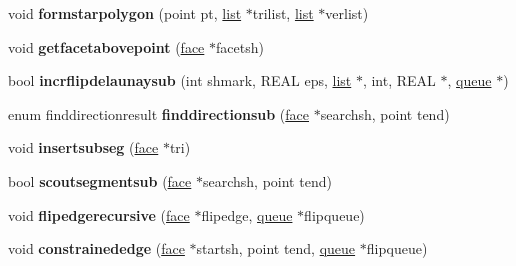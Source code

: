 \begin{DoxyCompactItemize}
\item 
\hypertarget{classtetgenmesh_a7dfee53a501a95a80055efa093c525bc}{void {\bfseries formstarpolygon} (point pt, \hyperlink{classtetgenmesh_1_1list}{list} $\ast$trilist, \hyperlink{classtetgenmesh_1_1list}{list} $\ast$verlist)}\label{classtetgenmesh_a7dfee53a501a95a80055efa093c525bc}

\item 
\hypertarget{classtetgenmesh_a4656a3a925ecfc5960618ca20ae62d00}{void {\bfseries getfacetabovepoint} (\hyperlink{classtetgenmesh_1_1face}{face} $\ast$facetsh)}\label{classtetgenmesh_a4656a3a925ecfc5960618ca20ae62d00}

\item 
\hypertarget{classtetgenmesh_a21b5256f3375f8913c26253fcd84c0a5}{bool {\bfseries incrflipdelaunaysub} (int shmark, R\-E\-A\-L eps, \hyperlink{classtetgenmesh_1_1list}{list} $\ast$, int, R\-E\-A\-L $\ast$, \hyperlink{classtetgenmesh_1_1queue}{queue} $\ast$)}\label{classtetgenmesh_a21b5256f3375f8913c26253fcd84c0a5}

\item 
\hypertarget{classtetgenmesh_a352a00142f9d086c11a5af35dc51bcb3}{enum finddirectionresult {\bfseries finddirectionsub} (\hyperlink{classtetgenmesh_1_1face}{face} $\ast$searchsh, point tend)}\label{classtetgenmesh_a352a00142f9d086c11a5af35dc51bcb3}

\item 
\hypertarget{classtetgenmesh_a23e3ef2cf4cd6de5d129ee2d192925e9}{void {\bfseries insertsubseg} (\hyperlink{classtetgenmesh_1_1face}{face} $\ast$tri)}\label{classtetgenmesh_a23e3ef2cf4cd6de5d129ee2d192925e9}

\item 
\hypertarget{classtetgenmesh_ae1ce1d0c92d8892836e9f34aedf5aef3}{bool {\bfseries scoutsegmentsub} (\hyperlink{classtetgenmesh_1_1face}{face} $\ast$searchsh, point tend)}\label{classtetgenmesh_ae1ce1d0c92d8892836e9f34aedf5aef3}

\item 
\hypertarget{classtetgenmesh_a082b4d620867c0647891efa2b36eb9fb}{void {\bfseries flipedgerecursive} (\hyperlink{classtetgenmesh_1_1face}{face} $\ast$flipedge, \hyperlink{classtetgenmesh_1_1queue}{queue} $\ast$flipqueue)}\label{classtetgenmesh_a082b4d620867c0647891efa2b36eb9fb}

\item 
\hypertarget{classtetgenmesh_a9916910d583613006ec2f372c6126574}{void {\bfseries constrainededge} (\hyperlink{classtetgenmesh_1_1face}{face} $\ast$startsh, point tend, \hyperlink{classtetgenmesh_1_1queue}{queue} $\ast$flipqueue)}\label{classtetgenmesh_a9916910d583613006ec2f372c6126574}


\end{DoxyCompactItemize}
